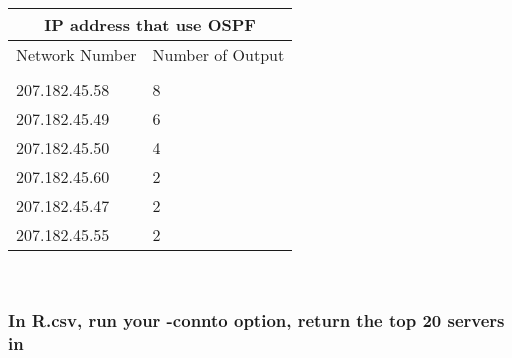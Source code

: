 \documentclass[letterpaper,10pt,titlepage,draftclsnofoot,onecolumn]{IEEEtran}
\begin{document}
\hfill\\

\begin{tabular}{ |p{3cm}||p{3cm}|  }
 \hline
 \multicolumn{2}{|c|}{IP address that use OSPF} \\
 \hline
 Network Number & Number of Output\\
 \hline 
 &\\
 207.182.45.58 & 8\\
207.182.45.49 & 6\\
207.182.45.50 & 4\\
207.182.45.60 & 2\\
207.182.45.47 & 2\\
207.182.45.55 & 2\\
 \hline
\end{tabular}

\hfill\\

\subsubsection{In R.csv, run your -connto option, return the top 20 servers in}

\hfill\\
\end{document}
